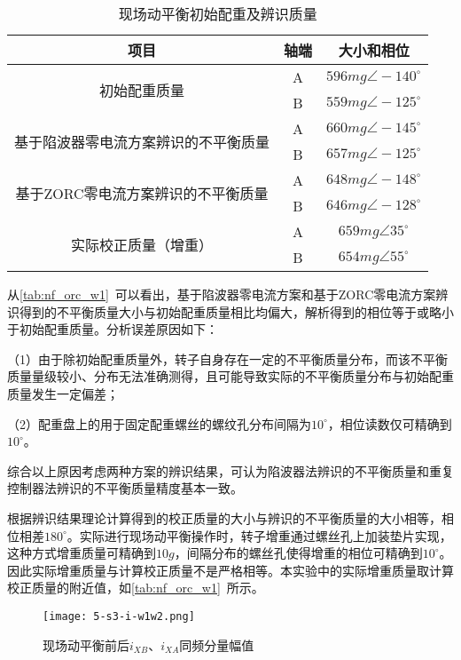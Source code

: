 \documentclass[
  lang=cn,
  degree=master,
  openany,oneside
]{nuaathesis}
\begin{document}
\begin{table}[h!]
  \caption[现场动平衡初始配重及辨识质量]{现场动平衡初始配重及辨识质量\label{tab:nf_orc_w1}}
\begin{tabular}{ccc}
    \toprule
    	项目  & 轴端 & 大小和相位 \\
    \midrule
		\multirow{2}{*}{初始配重质量}   
		& A  & $596mg \angle -140^{\circ}$      \\
		& B  & $559mg \angle -125^{\circ}$      \\    
		\multirow{2}{*}{基于陷波器零电流方案辨识的不平衡质量}   
		& A  & $660mg \angle -145^{\circ}$      \\
		& B  & $657mg \angle -125^{\circ}$      \\
		\multirow{2}{*}{基于ZORC零电流方案辨识的不平衡质量} 
		& A  & $648mg \angle -148^{\circ}$      \\
        & B  & $646mg \angle -128^{\circ}$     	\\
		\multirow{2}{*}{实际校正质量（增重）} 
		& A  & $659mg \angle 35^{\circ}$      \\
        & B  & $654mg \angle 55^{\circ}$     	\\        
    \bottomrule
\end{tabular}
\end{table}

从\autoref{tab:nf_orc_w1}~可以看出，基于陷波器零电流方案和基于ZORC零电流方案辨识得到的不平衡质量大小与初始配重质量相比均偏大，解析得到的相位等于或略小于初始配重质量。分析误差原因如下：

（1）由于除初始配重质量外，转子自身存在一定的不平衡质量分布，而该不平衡质量量级较小、分布无法准确测得，且可能导致实际的不平衡质量分布与初始配重质量发生一定偏差；

（2）配重盘上的用于固定配重螺丝的螺纹孔分布间隔为$10^{\circ}$，相位读数仅可精确到$10^{\circ}$。

综合以上原因考虑两种方案的辨识结果，可认为陷波器法辨识的不平衡质量和重复控制器法辨识的不平衡质量精度基本一致。

根据辨识结果理论计算得到的校正质量的大小与辨识的不平衡质量的大小相等，相位相差$180^{\circ}$。实际进行现场动平衡操作时，转子增重通过螺丝孔上加装垫片实现，这种方式增重质量可精确到$10g$，间隔分布的螺丝孔使得增重的相位可精确到$10^{\circ}$。因此实际增重质量与计算校正质量不是严格相等。本实验中的实际增重质量取计算校正质量的附近值，如\autoref{tab:nf_orc_w1}~所示。

\begin{figure}[h!]
	\texttt{[image: 5-s3-i-w1w2.png]}
	\caption{现场动平衡前后$i_{XB}$、$i_{XA}$同频分量幅值}
	\label{fig:5-s3-i-w1w2}
\end{figure}
\end{document}
